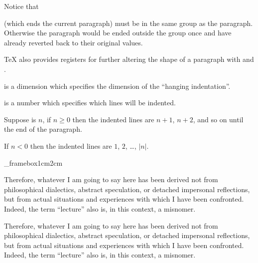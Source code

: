 {{    \textbox\empty{1cm}{\lastey+.5cm}{\hsize-2cm}{}
        Notice that \macroname\par{} (which ends the current paragraph) must be in the same group as the paragraph.
        Otherwise the paragraph would be ended outside the group once \macroname\leftskip{} and \macroname\rightskip{} have
        already reverted back to their original values.
    \endtextbox

\endslide

\beginslide
    \bheadline

    \textbox\empty{1cm}{2cm}{\hsize-2cm}{}
        \TeX{} also provides registers for further altering the shape of a paragraph with \macroname\hangindent{} and
        \macroname\hangafter{}.

        \macroname\hangindent{} is a dimension which specifies the dimension of the ``hanging indentation''.

        \macroname\hangafter{} is a number which specifies which lines will be indented.

        Suppose \macroname\hangafter{} is $n$, if $n\geq0$ then the indented lines are $n+1$, $n+2$, and so on until the end of
        the paragraph.

        If $n<0$ then the indented lines are $1$, $2$, \dots, $|n|$.
    \endtextbox

\endslide

\beginslide
    \bheadline

    \textbox\_framebox{1cm}{2cm}{\hsize-2cm}{}
\beginhi
{\hangindent=1cm 
Therefore, whatever I am going to say here has been derived
not from philosophical dialectics, abstract speculation, or
detached impersonal reflections, but from actual situations
and experiences with which I have been confronted. Indeed,
the term ``lecture'' also is, in this context, a misnomer.
\par}
\endhi
    \endtextbox

    \textbox{}
        {\hangindent=1cm 
        Therefore, whatever I am going to say here has been derived
        not from philosophical dialectics, abstract speculation, or
        detached impersonal reflections, but from actual situations
        and experiences with which I have been confronted. Indeed,
        the term ``lecture'' also is, in this context, a misnomer.
        \par}
    \endtextbox

}}
